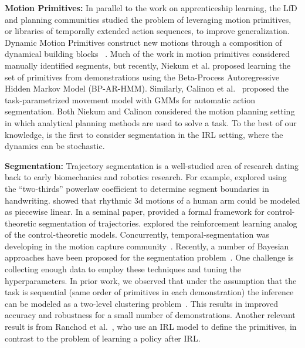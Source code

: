 \vspace{0.5em}\noindent\textbf{Motion Primitives: } In parallel to the work on apprenticeship learning, the LfD and planning communities studied the problem of leveraging motion primitives, or libraries of temporally extended action sequences, to improve generalization. 
Dynamic Motion Primitives construct new motions through a composition of dynamical building blocks ~\cite{ijspreet2002learning,pastor2009learning,manschitz2015learning}.
Much of the work in motion primitives considered manually identified segments, but recently, Niekum et al. \cite{niekum2012learning} proposed learning the set of primitives from demonstrations using the Beta-Process Autoregressive Hidden Markov Model (BP-AR-HMM).
Similarly, Calinon et al.~\cite{calinon2014skills} proposed the task-parametrized movement model with GMMs for automatic action segmentation.
Both Niekum and Calinon considered the motion planning setting in which analytical planning methods are used to solve a task.
To the best of our knowledge, \hirl is the first to consider segmentation in the IRL setting, where the dynamics can be stochastic.

\vspace{0.5em}\noindent\textbf{Segmentation: } Trajectory segmentation is a well-studied area of research dating back to early biomechanics and robotics research.
For example, \cite{viviani1985segmentation} explored using the ``two-thirds'' powerlaw coefficient to determine segment boundaries in handwriting.
\cite{morasso1983three} showed that rhythmic 3d motions of a human arm could be modeled as piecewise linear.
In a seminal paper, \cite{sternad1999segmentation} provided a formal framework for control-theoretic segmentation of trajectories.
\cite{botvinick2009hierarchically} explored the reinforcement learning analog of the control-theoretic models.
Concurrently, temporal-segmentation was developing in the motion capture community~\citep{moeslund2001survey}.
Recently, a number of Bayesian approaches have been proposed for the segmentation problem~\citep{asfour2006imitation,calinon2004stochastic,kruger2010learning, vakanski2012trajectory,tanwani2016learning}.
One challenge is collecting enough data to employ these techniques and tuning the hyperparameters.
In prior work, we observed that under the assumption that the task is sequential (same order of primitives in each demonstration) the inference can be modeled as a two-level clustering problem~\cite{krishnan2015tsc}.
This results in improved accuracy and robustness for a small number of demonstrations.
Another relevant result is from Ranchod et al.~\cite{ranchod2015nonparametric}, who use an IRL model to define the primitives, in contrast to the problem of learning a policy after IRL.

